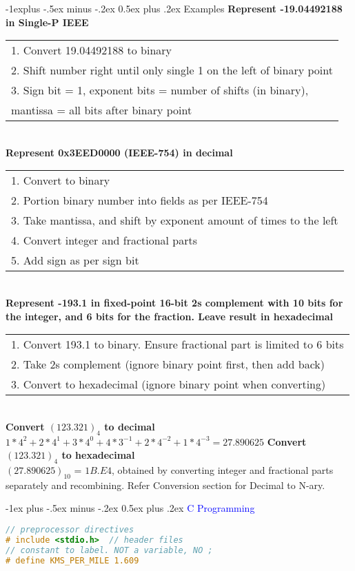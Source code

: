 \documentclass[10pt,landscape]{article}
\makeatletter
\renewcommand{\section}{\@startsection{section}{1}{0mm}%
                                {-1ex plus -.5ex minus -.2ex}%
                                {0.5ex plus .2ex}%
                                {\normalfont\large\bfseries}}
\renewcommand{\subsection}{\@startsection{subsection}{2}{0mm}%
                                {-1explus -.5ex minus -.2ex}%
                                {0.5ex plus .2ex}%
                                {\normalfont\normalsize\bfseries}}
\makeatother
\begin{document}
\begin{multicols}{3}
\subsection{Examples}
\textbf{Represent -19.04492188 in Single-P IEEE} \\ 
\begin{tabular}{l}
1. Convert 19.04492188 to binary \\ 
2. Shift number right until only single 1 on the left of binary point \\ 
3. Sign bit = 1, exponent bits = number of shifts (in binary), \\ mantissa = all bits after binary point 
\end{tabular} \\ 
\textbf{Represent 0x3EED0000 (IEEE-754) in decimal} \\ 
\begin{tabular}{l}
1. Convert to binary \\ 
2. Portion binary number into fields as per IEEE-754 \\ 
3. Take mantissa, and shift by exponent amount of times to the left \\ 
4. Convert integer and fractional parts \\ 
5. Add sign as per sign bit 
\end{tabular} \\ 
\textbf{Represent -193.1 in fixed-point 16-bit 2s complement with 10 bits for the integer, and 6 bits for the fraction. Leave result in hexadecimal} \\
\begin{tabular}{l}
1. Convert 193.1 to binary. Ensure fractional part is limited to 6 bits \\ 
2. Take 2s complement (ignore binary point first, then add back) \\ 
3. Convert to hexadecimal (ignore binary point when converting) 
\end{tabular} \\ 
\textbf{Convert $(123.321)_4$ to decimal} \\ 
$1 * 4^2 + 2 * 4^1 + 3 * 4^0 + 4 * 3^{-1} + 2 * 4^{-2} + 1 * 4^{-3} = 27.890625$
\textbf{Convert $(123.321)_4$ to hexadecimal} \\ 
$(27.890625)_10$ = $1B.E4$, obtained by converting integer and fractional parts separately and recombining. Refer Conversion section for Decimal to N-ary. 


\newpage
\section{\textcolor{blue}{C Programming}} 
\begin{lstlisting}[language=C]
// preprocessor directives 
# include <stdio.h>  // header files 
// constant to label. NOT a variable, NO ; 
# define KMS_PER_MILE 1.609 


\end{lstlisting}
\end{multicols}
\end{document}
